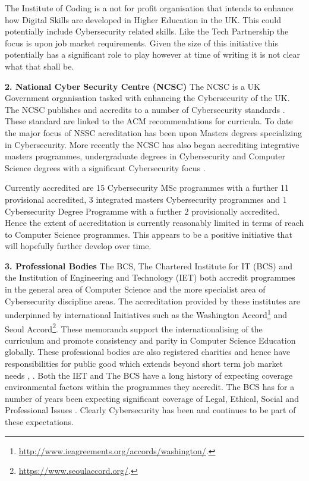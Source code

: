 \documentclass[conference]{IEEEtran}
\begin{document}
The Institute of Coding is a not for profit organisation that intends to enhance how Digital Skills are developed in Higher Education in the UK. This could potentially include Cybersecurity related skills. Like the Tech Partnership the focus is upon job market requirements.  Given the size of this initiative this potentially has a significant role to play however at time of writing it is not clear what that shall be.

\textbf{2. National Cyber Security Centre (NCSC)}
The NCSC is a UK Government organisation tasked with enhancing the Cybersecurity of the UK. The NCSC publishes and accredits to a number of Cybersecurity standards \cite{NCSC2018a}. These standard are linked to the ACM recommendations for curricula. To date the major focus of NSSC acreditation has been upon Masters degrees specializing in Cybersecurity. More recently the NCSC has also began accrediting integrative masters programmes, undergraduate degrees in Cybersecurity and Computer Science degrees with a significant Cybersecurity focus \cite{NCSC2018b}.

Currently accredited are 15 Cybersecurity MSc programmes with a further 11 provisional accredited, 3 integrated masters Cybersecurity programmes and 1 Cybersecurity Degree Programme with a further 2 provisionally accredited. Hence the extent of accreditation is currently reasonably limited in terms of reach to Computer Science programmes. This appears to be a positive initiative that will hopefully further develop over time. 

\textbf{3. Professional Bodies}
The BCS, The Chartered Institute for IT (BCS) and the Institution of Engineering and Technology (IET) both accredit programmes in the general area of Computer Science and the more specialist area of Cybersecurity discipline areas. The accreditation provided by these institutes are underpinned by international Initiatives such as the Washington Accord\footnote{\url{http://www.ieagreements.org/accords/washington/}.} and Seoul Accord\footnote{\url{https://www.seoulaccord.org/}.}. These memoranda support the internationalising of the curriculum and promote consistency and parity in Computer Science Education globally.   These professional bodies are also registered charities and hence have responsibilities for public good which extends beyond short term job market needs \cite{Stensaker2006}, \cite{Mutereko2017}. Both the IET and The BCS have a long history of expecting coverage environmental factors within the programmes they accredit. The BCS has for a number of years been expecting significant coverage of Legal, Ethical, Social and Professional Issues \cite{Brooke2018}. Clearly Cybersecurity has been and continues to be part of these expectations. 
\end{document}
